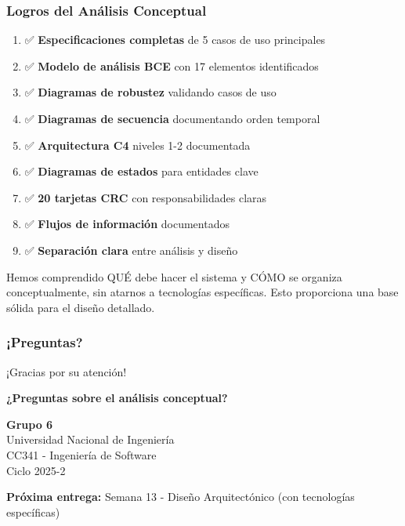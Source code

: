 \documentclass[aspectratio=169]{beamer}
\begin{document}
\begin{frame}
\frametitle{Logros del Análisis Conceptual}

\begin{enumerate}
\item ✅ \textbf{Especificaciones completas} de 5 casos de uso principales
\item ✅ \textbf{Modelo de análisis BCE} con 17 elementos identificados
\item ✅ \textbf{Diagramas de robustez} validando casos de uso
\item ✅ \textbf{Diagramas de secuencia} documentando orden temporal
\item ✅ \textbf{Arquitectura C4} niveles 1-2 documentada
\item ✅ \textbf{Diagramas de estados} para entidades clave
\item ✅ \textbf{20 tarjetas CRC} con responsabilidades claras
\item ✅ \textbf{Flujos de información} documentados
\item ✅ \textbf{Separación clara} entre análisis y diseño
\end{enumerate}

\vspace{0.5cm}

\begin{tcolorbox}[colback=green!5, colframe=green!50, title=Objetivo Cumplido]
Hemos comprendido QUÉ debe hacer el sistema y CÓMO se organiza conceptualmente, sin atarnos a tecnologías específicas. Esto proporciona una base sólida para el diseño detallado.
\end{tcolorbox}

\end{frame}

\begin{frame}
\frametitle{¡Preguntas?}

\begin{center}
\Large ¡Gracias por su atención! \\

\vspace{1cm}

\textbf{¿Preguntas sobre el análisis conceptual?}

\vspace{1cm}

\normalsize
\textbf{Grupo 6}\\
Universidad Nacional de Ingeniería\\
CC341 - Ingeniería de Software\\
Ciclo 2025-2

\vspace{0.5cm}

\textbf{Próxima entrega:} Semana 13 - Diseño Arquitectónico (con tecnologías específicas)

\end{center}

\end{frame}
\end{document}
